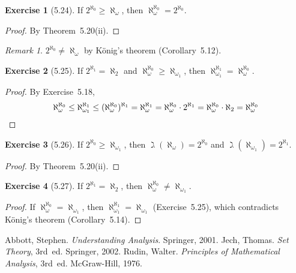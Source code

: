 \documentclass[letterpaper,12pt]{article}
\newcommand{\al}{\aleph}
\newcommand{\alo}{\al_{\omega}}
\newcommand{\aloo}{\al_{\omega_1}}
\newcommand{\mult}{\cdot}
\theoremstyle{definition}
\newtheorem*{exer}{Exercise}
\theoremstyle{remark}
\newtheorem*{rmk}{Remark}
\begin{document}
\begin{exer}[5.24]
If \(2^{\al_0}\ge\alo\), then \(\alo^{\al_0}=2^{\al_0}\).
\end{exer}
\begin{proof}
By Theorem~5.20(ii).
\end{proof}
\begin{rmk}
\(2^{\al_0}\ne\alo\) by K\"onig's theorem (Corollary~5.12).
\end{rmk}

\begin{exer}[5.25]
If \(2^{\al_1}=\al_2\) and \(\alo^{\al_0}\ge\aloo\), then \(\aloo^{\al_1}=\alo^{\al_0}\).
\end{exer}
\begin{proof}
By Exercise~5.18,
\[\alo^{\al_0}\le\aloo^{\al_1}\le(\alo^{\al_0})^{\al_1}=\alo^{\al_1}=\alo^{\al_0}\mult 2^{\al_1}=\alo^{\al_0}\mult\aleph_2=\alo^{\al_0}\qedhere\]
\end{proof}

\begin{exer}[5.26]
If \(2^{\al_0}\ge\aloo\), then \(\gimel(\alo)=2^{\al_0}\) and \(\gimel(\aloo)=2^{\al_1}\).
\end{exer}
\begin{proof}
By Theorem~5.20(ii).
\end{proof}

\begin{exer}[5.27]
If \(2^{\al_1}=\al_2\), then \(\alo^{\al_0}\ne\aloo\).
\end{exer}
\begin{proof}
If \(\alo^{\al_0}=\aloo\), then \(\aloo^{\al_1}=\aloo\) (Exercise~5.25), which contradicts K\"onig's theorem (Corollary~5.14).
\end{proof}

\begin{thebibliography}{0}
 Abbott, Stephen. \textit{Understanding Analysis}. Springer, 2001.
 Jech, Thomas. \textit{Set Theory}, 3rd~ed. Springer, 2002.
 Rudin, Walter. \textit{Principles of Mathematical Analysis}, 3rd~ed. McGraw-Hill, 1976.
\end{thebibliography}
\end{document}
